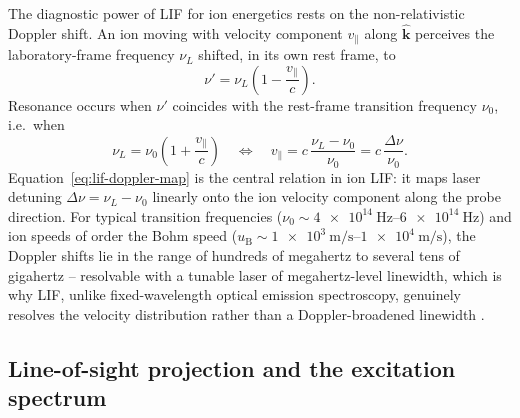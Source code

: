 The diagnostic power of LIF for ion energetics rests on the non-relativistic Doppler shift. An ion moving with velocity component $v_{\parallel}$ along $\hat{\mathbf{k}}$ perceives the laboratory-frame frequency $\nu_{L}$ shifted, in its own rest frame, to
\begin{equation}
\nu' = \nu_{L}\left(1 - \frac{v_{\parallel}}{c}\right).
\label{eq:lif-doppler-basic}
\end{equation}
Resonance occurs when $\nu'$ coincides with the rest-frame transition frequency $\nu_{0}$, i.e.\ when
\begin{equation}
\nu_{L} = \nu_{0}\left(1 + \frac{v_{\parallel}}{c}\right) \quad \Longleftrightarrow \quad v_{\parallel} = c\,\frac{\nu_{L}-\nu_{0}}{\nu_{0}} = c\,\frac{\Delta\nu}{\nu_{0}}.
\label{eq:lif-doppler-map}
\end{equation}
Equation~\eqref{eq:lif-doppler-map} is the central relation in ion LIF: it maps laser detuning $\Delta\nu = \nu_{L}-\nu_{0}$ linearly onto the ion velocity component along the probe direction. For typical transition frequencies ($\nu_{0} \sim \SI{4e14}{\hertz}$--$\SI{6e14}{\hertz}$) and ion speeds of order the Bohm speed ($u_{\mathrm{B}} \sim \SI{1e3}{\meter\per\second}$--$\SI{1e4}{\meter\per\second}$), the Doppler shifts lie in the range of hundreds of megahertz to several tens of gigahertz -- resolvable with a tunable laser of megahertz-level linewidth, which is why LIF, unlike fixed-wavelength optical emission spectroscopy, genuinely resolves the velocity distribution rather than a Doppler-broadened linewidth \cite{ref0292,ref0347}.

\subsection{Line-of-sight projection and the excitation spectrum}

